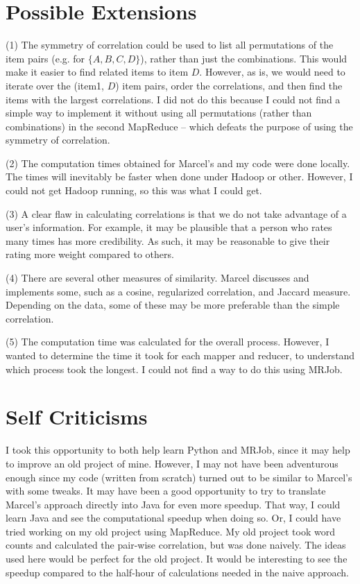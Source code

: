 \documentclass{article}
\begin{document}
\section{Possible Extensions}
(1) The symmetry of correlation could be used to list all permutations of the item pairs (e.g. for $\{A,B,C,D\}$), rather than just the combinations.  This would make it easier to find related items to item $D$. However, as is, we would need to iterate over the (item1, $D$) item pairs, order the correlations, and then find the items with the largest correlations. I did not do this because I could not find a simple way to implement it without using all permutations (rather than combinations) in the second MapReduce -- which defeats the purpose of using the symmetry of correlation.

(2) The computation times obtained for Marcel's and my code were done locally. The times will inevitably be faster when done under Hadoop or other. However, I could not get Hadoop running, so this was what I could get.

(3) A clear flaw in calculating correlations is that we do not take advantage of a user's information. For example, it may be plausible that a person who rates many times has more credibility. As such, it may be reasonable to give their rating more weight compared to others.

(4) There are several other measures of similarity. Marcel discusses and implements some, such as a cosine, regularized correlation, and Jaccard measure. Depending on the data, some of these may be more preferable than the simple correlation.

(5) The computation time was calculated for the overall process. However, I wanted to determine the time it took for each mapper and reducer, to understand which process took the longest. I could not find a way to do this using MRJob.

\section{Self Criticisms}
I took this opportunity to both help learn Python and MRJob, since it may help to improve an old project of mine. However, I may not have been adventurous enough since my code (written from scratch) turned out to be similar to Marcel's with some tweaks. It may have been a good opportunity to try to translate Marcel's approach directly into Java for even more speedup. That way, I could learn Java and see the computational speedup when doing so. Or, I could have tried working on my old project using MapReduce. My old project took word counts and calculated the pair-wise correlation, but was done naively. The ideas used here would be perfect for the old project. It would be interesting to see the speedup compared to the half-hour of calculations needed in the naive approach.
\end{document}
